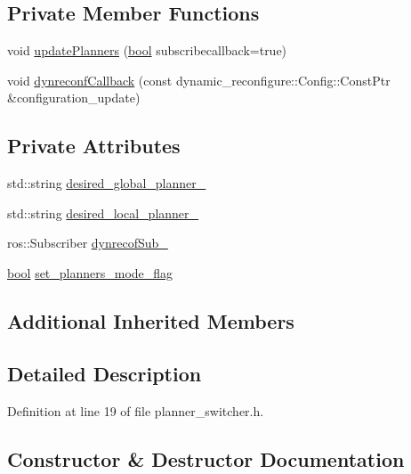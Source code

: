 \subsection*{Private Member Functions}
\begin{DoxyCompactItemize}
\item 
void \hyperlink{classcl__move__base__z_1_1PlannerSwitcher_a146641f63aea3185daab4c5cbb789550}{update\+Planners} (\hyperlink{classbool}{bool} subscribecallback=true)
\item 
void \hyperlink{classcl__move__base__z_1_1PlannerSwitcher_ad9371bd8d62600ef874e8914c3ec177b}{dynreconf\+Callback} (const dynamic\+\_\+reconfigure\+::\+Config\+::\+Const\+Ptr \&configuration\+\_\+update)
\end{DoxyCompactItemize}
\subsection*{Private Attributes}
\begin{DoxyCompactItemize}
\item 
std\+::string \hyperlink{classcl__move__base__z_1_1PlannerSwitcher_aef047d3778b2993c1df146bbad43e03d}{desired\+\_\+global\+\_\+planner\+\_\+}
\item 
std\+::string \hyperlink{classcl__move__base__z_1_1PlannerSwitcher_a6cbf65f11bb69125f913caaabdf7b4cf}{desired\+\_\+local\+\_\+planner\+\_\+}
\item 
ros\+::\+Subscriber \hyperlink{classcl__move__base__z_1_1PlannerSwitcher_ae902346f4f8e58241acc56cccaad8546}{dynrecof\+Sub\+\_\+}
\item 
\hyperlink{classbool}{bool} \hyperlink{classcl__move__base__z_1_1PlannerSwitcher_a6c14fd001513787ed213704e2d3dc383}{set\+\_\+planners\+\_\+mode\+\_\+flag}
\end{DoxyCompactItemize}
\subsection*{Additional Inherited Members}


\subsection{Detailed Description}


Definition at line 19 of file planner\+\_\+switcher.\+h.



\subsection{Constructor \& Destructor Documentation}
\mbox{\label{classcl__move__base__z_1_1PlannerSwitcher_aacdf8266ba7dc861efd460645587561f}} 
